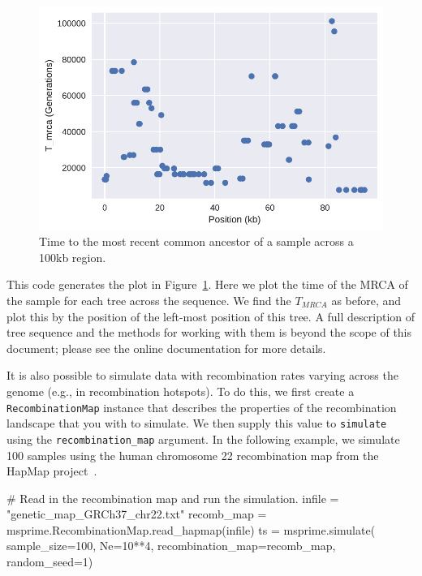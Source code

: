 \documentclass[graybox]{svmult}
\begin{document}
\begin{figure}
\begin{center}
\includegraphics[width=\textwidth]{images/simulations_50_0.pdf}
\end{center}
\caption{\label{fig:tree_tmrcas}Time to the most recent common ancestor of
a sample across a 100kb region.}
\end{figure}

This code generates the plot in Figure~\ref{fig:tree_tmrcas}.
Here we plot the time of the MRCA of the sample for each tree across the
sequence. We find the \(T_{MRCA}\) as before, and plot this by the
position of the left-most position of this tree. A full description of
tree sequence and the methods for working with them is beyond the scope
of this document; please see the online documentation for more details.

It is also possible to simulate data with recombination rates varying
across the genome (e.g., in recombination hotspots). To do this, we
first create a \texttt{RecombinationMap} instance that describes the
properties of the recombination landscape that you with to simulate. We
then supply this value to \texttt{simulate} using the
\texttt{recombination\_map} argument. In the following example, we
simulate 100 samples using the human chromosome 22 recombination map
from the HapMap project~\citep{international2003international}.

\begin{pythoncode}
# Read in the recombination map and run the simulation.
infile = "genetic_map_GRCh37_chr22.txt"
recomb_map = msprime.RecombinationMap.read_hapmap(infile)
ts = msprime.simulate(
    sample_size=100,
    Ne=10**4,
    recombination_map=recomb_map,
    random_seed=1)
\end{pythoncode}
\end{document}
